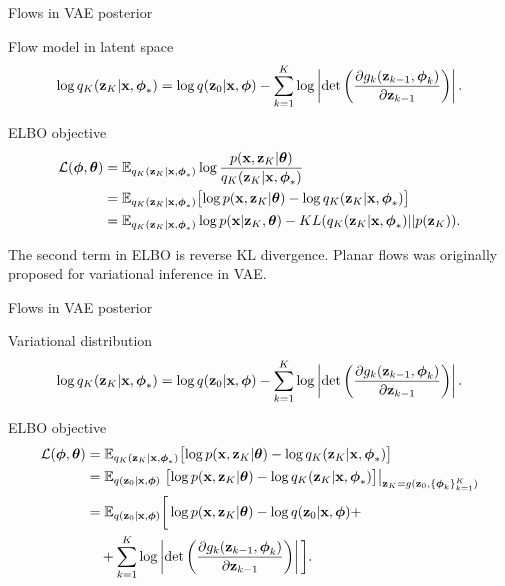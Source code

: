\begin{frame}{Flows in VAE posterior}
\begin{block}{Flow model in latent space}
	\vspace{-0.7cm}
	\[
	\log q_K(\mathbf{z}_K | \mathbf{x}, \boldsymbol{\phi}_*) = \log q(\mathbf{z}_0 | \mathbf{x}, \boldsymbol{\phi}) - \sum_{k=1}^K \log \left| \det \left( \frac{\partial g_k(\mathbf{z}_{k - 1}, \boldsymbol{\phi}_k)}{\partial \mathbf{z}_{k-1}} \right) \right|.
	\]
	\vspace{-0.5cm}
\end{block}
\begin{block}{ELBO objective}
	\vspace{-0.5cm}
	\begin{align*}
		\mathcal{L} (\boldsymbol{\phi}, \boldsymbol{\theta})  &= \mathbb{E}_{q_K(\mathbf{z}_K | \mathbf{x}, \boldsymbol{\phi}_*)} \log \frac{p(\mathbf{x}, \mathbf{z}_K | \boldsymbol{\theta})}{q_K(\mathbf{z}_K| \mathbf{x}, \boldsymbol{\phi}_*)} \\
		&= \mathbb{E}_{q_K(\mathbf{z}_K | \mathbf{x}, \boldsymbol{\phi}_*)} \bigl[\log p(\mathbf{x}, \mathbf{z}_K | \boldsymbol{\theta}) - \log q_K(\mathbf{z}_K| \mathbf{x}, \boldsymbol{\phi}_*) \bigr] \\ 
		&=  \mathbb{E}_{q_K(\mathbf{z}_K | \mathbf{x}, \boldsymbol{\phi}_*)} \log p(\mathbf{x} | \mathbf{z}_K, \boldsymbol{\theta}) - KL (q_K(\mathbf{z}_K| \mathbf{x}, \boldsymbol{\phi}_*) || p(\mathbf{z}_K)).
	\end{align*}
\end{block}
The second term in ELBO is reverse KL divergence. Planar flows was originally proposed for variational inference in VAE.
\end{frame}
\begin{frame}{Flows in VAE posterior}
\begin{block}{Variational distribution}
	\vspace{-0.5cm}
	\[
	\log q_K(\mathbf{z}_K | \mathbf{x}, \boldsymbol{\phi}_*) = \log q(\mathbf{z}_0 | \mathbf{x}, \boldsymbol{\phi}) - \sum_{k=1}^K \log \left| \det \left( \frac{\partial g_k(\mathbf{z}_{k - 1}, \boldsymbol{\phi}_k)}{\partial \mathbf{z}_{k-1}} \right) \right|.
	\]
	\vspace{-0.5cm}
\end{block}
\begin{block}{ELBO objective}
	\vspace{-0.5cm}
	\begin{align*}
		\mathcal{L} (\boldsymbol{\phi}, \boldsymbol{\theta}) 
		&= \mathbb{E}_{q_K(\mathbf{z}_K | \mathbf{x}, \boldsymbol{\phi}_*)} \bigl[\log p(\mathbf{x}, \mathbf{z}_K | \boldsymbol{\theta}) - \log q_K(\mathbf{z}_K| \mathbf{x}, \boldsymbol{\phi}_*) \bigr] \\
		&= \mathbb{E}_{q(\mathbf{z}_0 | \mathbf{x}, \boldsymbol{\phi})} \left. \bigl[\log p(\mathbf{x}, \mathbf{z}_K | \boldsymbol{\theta}) - \log q_K(\mathbf{z}_K| \mathbf{x}, \boldsymbol{\phi}_*) \bigr]\right|_{\mathbf{z}_K = g(\mathbf{z}_0, \{\boldsymbol{\phi}_k\}_{k=1}^K)} \\
		&= \mathbb{E}_{q(\mathbf{z}_0 | \mathbf{x}, \boldsymbol{\phi})} \bigg[\log p(\mathbf{x}, \mathbf{z}_K | \boldsymbol{\theta}) -  \log q(\mathbf{z}_0 | \mathbf{x}, \boldsymbol{\phi} ) + \\ & \quad  + \sum_{k=1}^K \log \left| \det \left( \frac{\partial g_k(\mathbf{z}_{k - 1}, \boldsymbol{\phi}_k)}{\partial \mathbf{z}_{k-1}} \right) \right| \bigg].
	\end{align*}
\end{block}
\end{frame}
